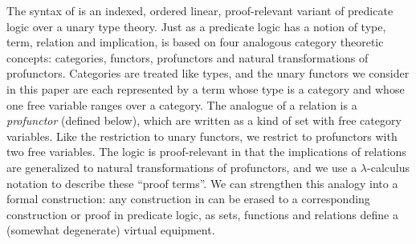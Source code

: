 \documentclass{llncs}
\begin{document}


%

The syntax of \vett{} is an indexed, ordered linear, proof-relevant
variant of predicate logic over a unary type theory.
%
Just as a predicate logic has a notion of type, term, relation and
implication, \vett{} is based on four analogous category theoretic
concepts: categories, functors, profunctors and natural transformations
of profunctors.
%
Categories are treated like types, and the unary functors we consider in
this paper are each represented by a term whose type is a category and
whose one free variable ranges over a category.
%
The analogue of a relation is a \emph{profunctor} (defined below), which
are written as a kind of set with free category variables.  Like the
restriction to unary functors, we restrict to profunctors with two free
variables.
%
The logic is proof-relevant in that the implications of relations are
generalized to natural transformations of profunctors, and we use a
$\lambda$-calculus notation to describe these ``proof terms''.
%
We can strengthen this analogy into a formal construction: any
construction in \vett{} can be erased to a corresponding construction
or proof in predicate logic, as sets, functions and relations define a 
(somewhat degenerate) virtual equipment.
\end{document}
